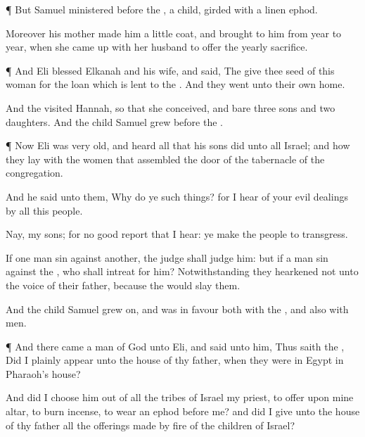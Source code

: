 {\par }{\PP {}¶ But
Samuel
ministered
before the
{},
{} a
child,
girded with a
linen
ephod.

Moreover his
mother
made him a
little
coat, and
brought
{} to him from
year to
year, when she came
up with her
husband to
offer the
yearly
sacrifice.


\par }{\PP {}¶ And
Eli
blessed
Elkanah and his
wife, and
said, The
{}
give thee
seed of this
woman for the
loan which is
lent to the
{}. And they
went unto their own
home.

And the
{}
visited
Hannah, so that she
conceived, and
bare
three
sons and
two
daughters. And the
child
Samuel
grew
before the
{}.


\par }{\PP {}¶ Now
Eli was
very
old, and
heard all that his
sons
did unto all
Israel; and how they
lay with the
women that
assembled
{} the
door of the
tabernacle of the
congregation.

And he
said unto them, Why
do ye such
things? for I
hear of your
evil
dealings by all this
people.

Nay, my
sons; for
{} no
good
report that I
hear: ye make the
{}
people to
transgress.

If one
man
sin against
another, the
judge shall
judge him: but if a
man
sin against the
{}, who shall
intreat for him? Notwithstanding they
hearkened not unto the
voice of their
father, because the
{}
would
slay them.

And the
child
Samuel
grew
on, and was in
favour both with the
{}, and also with
men.


\par }{\PP {}¶ And there
came a
man of
God unto
Eli, and
said unto him, Thus
saith the
{}, Did I
plainly
appear unto the
house of thy
father, when they were in
Egypt in
Pharaoh’s
house?

And did I
choose him out of all the
tribes of
Israel
{} my
priest, to
offer upon mine
altar, to
burn
incense, to
wear an
ephod
before me? and did I
give unto the
house of thy
father all the offerings made by
fire of the
children of
Israel?

}
